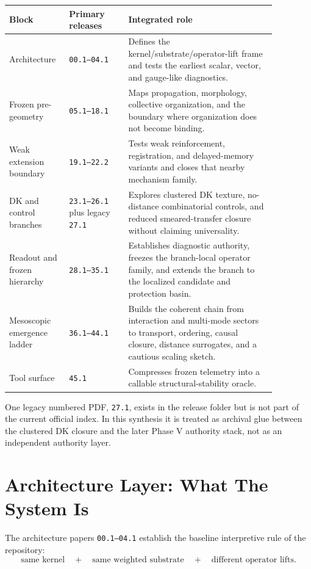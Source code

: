 \documentclass[11pt]{article}
\begin{document}
\begin{center}
\small
\begin{tabular}{p{0.17\linewidth}p{0.20\linewidth}p{0.50\linewidth}}
\toprule
Block & Primary releases & Integrated role \\
\midrule
Architecture & \texttt{00.1--04.1} & Defines the kernel/substrate/operator-lift frame and tests the earliest scalar, vector, and gauge-like diagnostics. \\
Frozen pre-geometry & \texttt{05.1--18.1} & Maps propagation, morphology, collective organization, and the boundary where organization does not become binding. \\
Weak extension boundary & \texttt{19.1--22.2} & Tests weak reinforcement, registration, and delayed-memory variants and closes that nearby mechanism family. \\
DK and control branches & \texttt{23.1--26.1} plus legacy \texttt{27.1} & Explores clustered DK texture, no-distance combinatorial controls, and reduced smeared-transfer closure without claiming universality. \\
Readout and frozen hierarchy & \texttt{28.1--35.1} & Establishes diagnostic authority, freezes the branch-local operator family, and extends the branch to the localized candidate and protection basin. \\
Mesoscopic emergence ladder & \texttt{36.1--44.1} & Builds the coherent chain from interaction and multi-mode sectors to transport, ordering, causal closure, distance surrogates, and a cautious scaling sketch. \\
Tool surface & \texttt{45.1} & Compresses frozen telemetry into a callable structural-stability oracle. \\
\bottomrule
\end{tabular}
\end{center}

One legacy numbered PDF, \texttt{27.1}, exists in the release folder but is not part of the current official index. In this synthesis it is treated as archival glue between the clustered DK closure and the later Phase V authority stack, not as an independent authority layer.

\section{Architecture Layer: What The System Is}

The architecture papers \texttt{00.1--04.1} establish the baseline interpretive rule of the repository:
\[
\text{same kernel}
\quad + \quad
\text{same weighted substrate}
\quad + \quad
\text{different operator lifts}.
\]
\end{document}
